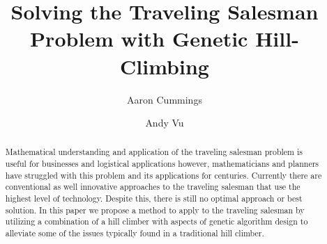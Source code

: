 \documentclass[sigplan,screen]{acmart}
\begin{document}
\title{Solving the Traveling Salesman Problem with Genetic Hill-Climbing}

\author{Aaron Cummings}

\author{Andy Vu}
\authornotemark[1]

\renewcommand{\shortauthors}{Cummings et al.}

\begin{abstract}
    Mathematical understanding and application of the traveling salesman problem
    is useful for businesses and logistical applications however, mathematicians
    and planners have struggled with this problem and its applications for
    centuries. Currently there are conventional as well innovative approaches to
    the traveling salesman that use the highest level of technology. Despite
    this, there is still no optimal approach or best solution. In this paper we
    propose a method to apply to the traveling salesman by utilizing a
    combination of a hill climber with aspects of genetic algorithm design to
    alleviate some of the issues typically found in a traditional hill climber.
\end{abstract}

\end{document}
